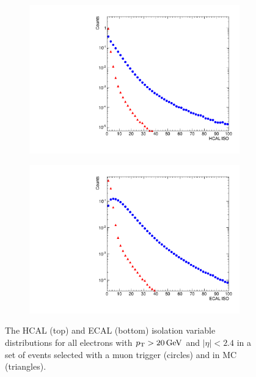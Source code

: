 \begin{figure}[!htbp]
    \centering
    \begin{subfigure}[b]{0.65\textwidth}
        \includegraphics[width=\textwidth]{figures/hcal_iso.pdf}
        \caption{}
        \label{fig:hcal_iso}
    \end{subfigure}
    \begin{subfigure}[b]{0.65\textwidth}
        \includegraphics[width=\textwidth]{figures/ecal_iso.pdf}
        \caption{}
        \label{fig:ecal_iso}
    \end{subfigure}
    \caption[
        Distributions of HCAL and ECAL isolation variables in data and MC.
    ]{
        The HCAL (top) and ECAL (bottom) isolation variable distributions for
        all electrons with $p_{\mathrm{T}} > 20 \,\text{Ge\hspace{-.08em}V}$ and $|\eta| < 2.4$ in a set of
        events selected with a muon trigger (circles) and in \MADGRAPH \Ztoee
        MC (triangles).
    }
    \label{fig:hcal_ecal_isos}
\end{figure}

